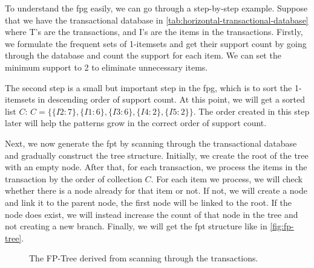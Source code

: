To understand the \acl{fpg} easily, we can go through a step-by-step example.
Suppose that we have the transactional database in \autoref{tab:horizontal-transactional-database} where T's are the transactions, and I's are the items in the transactions.
Firstly, we formulate the frequent sets of 1-itemsets and get their support count by going through the database and count the support for each item.
We can set the minimum support to 2 to eliminate unnecessary items.

The second step is a small but important step in the \acl{fpg}, which is to sort the 1-itemsets in descending order of support count.
At this point, we will get a sorted list $C$: $C=\{\{I2:7\}, \{I1:6\}, \{I3:6\}, \{I4:2\}, \{I5:2\}\}$.
The order created in this step later will help the patterns grow in the correct order of support count.

Next, we now generate the \acl{fpt} by scanning through the transactional database and gradually construct the tree structure.
 Initially, we create the root of the tree with an empty node.
After that, for each transaction, we process the items in the transaction by the order of collection $C$.
For each item we process, we will check whether there is a node already for that item or not.
If not, we will create a node and link it to the parent node, the first node will be linked to the root.
If the node does exist, we will instead increase the count of that node in the tree and not creating a new branch.
Finally, we will get the \acl{fpt} structure like in \autoref{fig:fp-tree}.

\begin{figure}
    \centering
    \caption{The FP-Tree derived from scanning through the transactions.}
    \label{fig:fp-tree}
\end{figure}

